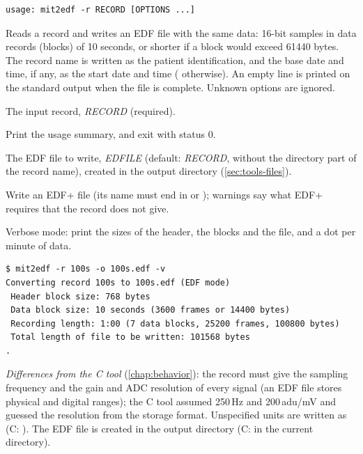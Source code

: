 \begin{lstlisting}[style=signature,language={}]
usage: mit2edf -r RECORD [OPTIONS ...]
\end{lstlisting}
Reads a record and writes an EDF file with the same data: 16-bit samples in data records
(blocks) of 10 seconds, or shorter if a block would exceed 61440 bytes. The record name is
written as the patient identification, and the base date and time, if any, as the start
date and time ( otherwise). An empty line is printed on the
standard output when the file is complete. Unknown options are ignored.
\begin{params}
\item[-r] The input record, \textit{RECORD} (required).
\item[-h] Print the usage summary, and exit with status 0.
\item[-o] The EDF file to write, \textit{EDFILE} (default: \textit{RECORD},
  without the directory part of the record name), created in the output directory
  (\cref{sec:tools-files}).
\item[-p] Write an EDF+ file (its name must end in  or ); warnings say
  what EDF+ requires that the record does not give.
\item[-v] Verbose mode: print the sizes of the header, the blocks and the file, and a dot
  per minute of data.
\end{params}
\begin{lstlisting}[style=text]
$ mit2edf -r 100s -o 100s.edf -v
Converting record 100s to 100s.edf (EDF mode)
 Header block size: 768 bytes
 Data block size: 10 seconds (3600 frames or 14400 bytes)
 Recording length: 1:00 (7 data blocks, 25200 frames, 100800 bytes)
 Total length of file to be written: 101568 bytes
.
\end{lstlisting}
\textit{Differences from the C tool} (\cref{chap:behavior}): the record must give the
sampling frequency and the gain and ADC resolution of every signal (an EDF file stores
physical and digital ranges); the C tool assumed 250\,Hz and 200\,adu/mV and guessed the
resolution from the storage format. Unspecified units are written as  (C:
). The EDF file is created in the output directory (C: in the current directory).

